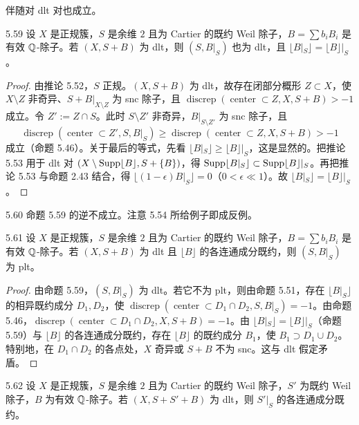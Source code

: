 伴随对 dlt 对也成立。

\begin{propositionp}{5.59}
设 $X$ 是正规簇，$S$ 是余维 $2$ 且为 Cartier 的既约 Weil 除子，$B=\sum b_iB_i$ 是有效 $\mathbb{Q}$-除子。若 $(X,S+B)$ 为 dlt，则 $(S,B|_S)$ 也为 dlt，且 $\lfloor B|_S\rfloor=\lfloor B\rfloor|_S$。
\end{propositionp}

\begin{proof}
由推论 5.52，$S$ 正规。$(X,S+B)$ 为 dlt，故存在闭部分概形 $Z\subset X$，使 $X\setminus Z$ 非奇异、$S+B|_{X\setminus Z}$ 为 snc 除子，且 $\operatorname{discrep}(\operatorname{center}\subset Z,X,S+B)>-1$ 成立。令 $Z':=Z\cap S$。此时 $S\setminus Z'$ 非奇异，$B|_{S\setminus Z'}$ 为 snc 除子，且
\[
\operatorname{discrep}(\operatorname{center}\subset Z',S,B|_S)\ge\operatorname{discrep}(\operatorname{center}\subset Z,X,S+B)>-1
\]
成立（命题 5.46）。关于最后的等式，先看 $\lfloor B|_S\rfloor\ge\lfloor B\rfloor|_S$，这是显然的。把推论 5.53 用于 dlt 对 $(X\setminus\operatorname{Supp}\lfloor B\rfloor,S+\{B\})$，得 $\operatorname{Supp}\lfloor B|_S\rfloor\subset\operatorname{Supp}\lfloor B\rfloor|_S$。再把推论 5.53 与命题 2.43 结合，得 $\lfloor(1-\epsilon)B|_S\rfloor=0$（$0<\epsilon\ll1$）。故 $\lfloor B|_S\rfloor=\lfloor B\rfloor|_S$。
\end{proof}

\begin{remark}{5.60}
命题 5.59 的逆不成立。注意 5.54 所给例子即成反例。
\end{remark}

\begin{propositionp}{5.61}
设 $X$ 是正规簇，$S$ 是余维 $2$ 且为 Cartier 的既约 Weil 除子，$B=\sum b_iB_i$ 是有效 $\mathbb{Q}$-除子。若 $(X,S+B)$ 为 dlt 且 $\lfloor B\rfloor$ 的各连通成分既约，则 $(S,B|_S)$ 为 plt。
\end{propositionp}

\begin{proof}
由命题 5.59，$(S,B|_S)$ 为 dlt。若它不为 plt，则由命题 5.51，存在 $\lfloor B|_S\rfloor$ 的相异既约成分 $D_1,D_2$，使 $\operatorname{discrep}(\operatorname{center}\subset D_1\cap D_2,S,B|_S)=-1$。由命题 5.46，$\operatorname{discrep}(\operatorname{center}\subset D_1\cap D_2,X,S+B)=-1$。由 $\lfloor B|_S\rfloor=\lfloor B\rfloor|_S$（命题 5.59）与 $\lfloor B\rfloor$ 的各连通成分既约，存在 $\lfloor B\rfloor$ 的既约成分 $B_1$，使 $B_1\supset D_1\cup D_2$。特别地，在 $D_1\cap D_2$ 的各点处，$X$ 奇异或 $S+B$ 不为 snc。这与 dlt 假定矛盾。
\end{proof}

\begin{corollaryp}{5.62}
设 $X$ 是正规簇，$S$ 是余维 $2$ 且为 Cartier 的既约 Weil 除子，$S'$ 为既约 Weil 除子，$B$ 为有效 $\mathbb{Q}$-除子。若 $(X,S+S'+B)$ 为 dlt，则 $S'|_S$ 的各连通成分既约。
\end{corollaryp}

